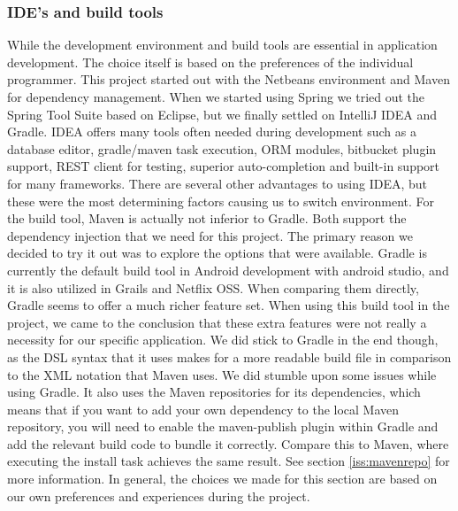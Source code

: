 \documentclass[12pt]{article}
\begin{document}
\begin{multicols}{2}
\subsubsection{IDE's and build tools}\label{sec:idebuild}
While the development environment and build tools are essential in application development. The choice itself is based on the preferences of the individual programmer. This project started out with the Netbeans environment and Maven for dependency management. When we started using Spring we tried out the Spring Tool Suite based on Eclipse, but we finally settled on IntelliJ IDEA and Gradle. IDEA offers many tools often needed during development such as a database editor, gradle/maven task execution, ORM modules, bitbucket plugin support, REST client for testing, superior auto-completion and built-in support for many frameworks. There are several other advantages to using IDEA, but these were the most determining factors causing us to switch environment. For the build tool, Maven is actually not inferior to Gradle. Both support the dependency injection that we need for this project. The primary reason we decided to try it out was to explore the options that were available. Gradle is currently the default build tool in Android development with android studio, and it is also utilized in Grails and Netflix OSS. When comparing them directly, Gradle seems to offer a much richer feature set. \cite{GradleVsMaven48:online} When using this build tool in the project, we came to the conclusion that these extra features were not really a necessity for our specific application. We did stick to Gradle in the end though, as the DSL syntax that it uses makes for a more readable build file in comparison to the XML notation that Maven uses. We did stumble upon some issues while using Gradle. It also uses the Maven repositories for its dependencies, which means that if you want to add your own dependency to the local Maven repository, you will need to enable the maven-publish plugin within Gradle and add the relevant build code to bundle it correctly. Compare this to Maven, where executing the install task achieves the same result. See section \ref{iss:mavenrepo} for more information. In general, the choices we made for this section are based on our own preferences and experiences during the project.

\end{multicols}
\end{document}
